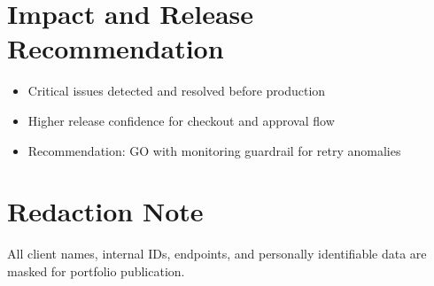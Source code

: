 \documentclass[11pt,a4paper]{article}
\begin{document}
\section*{Impact and Release Recommendation}
\begin{itemize}
  \item Critical issues detected and resolved before production
  \item Higher release confidence for checkout and approval flow
  \item Recommendation: GO with monitoring guardrail for retry anomalies
\end{itemize}

\section*{Redaction Note}
\textcolor{textmuted}{All client names, internal IDs, endpoints, and personally identifiable data are masked for portfolio publication.}
\end{document}
